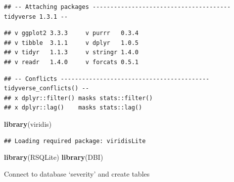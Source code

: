 \documentclass[]{book}
\newenvironment{Shaded}{\begin{snugshade}}{\end{snugshade}}
\newcommand{\KeywordTok}[1]{\textcolor[rgb]{0.13,0.29,0.53}{\textbf{#1}}}
\newcommand{\NormalTok}[1]{#1}
\begin{document}
\begin{verbatim}
## -- Attaching packages --------------------------------------- tidyverse 1.3.1 --
\end{verbatim}

\begin{verbatim}
## v ggplot2 3.3.3     v purrr   0.3.4
## v tibble  3.1.1     v dplyr   1.0.5
## v tidyr   1.1.3     v stringr 1.4.0
## v readr   1.4.0     v forcats 0.5.1
\end{verbatim}

\begin{verbatim}
## -- Conflicts ------------------------------------------ tidyverse_conflicts() --
## x dplyr::filter() masks stats::filter()
## x dplyr::lag()    masks stats::lag()
\end{verbatim}

\begin{Shaded}
\begin{Highlighting}[]
\KeywordTok{library}\NormalTok{(viridis)}
\end{Highlighting}
\end{Shaded}

\begin{verbatim}
## Loading required package: viridisLite
\end{verbatim}

\begin{Shaded}
\begin{Highlighting}[]
\KeywordTok{library}\NormalTok{(RSQLite)}
\KeywordTok{library}\NormalTok{(DBI)}
\end{Highlighting}
\end{Shaded}

Connect to database `severity' and create tables
\end{document}
